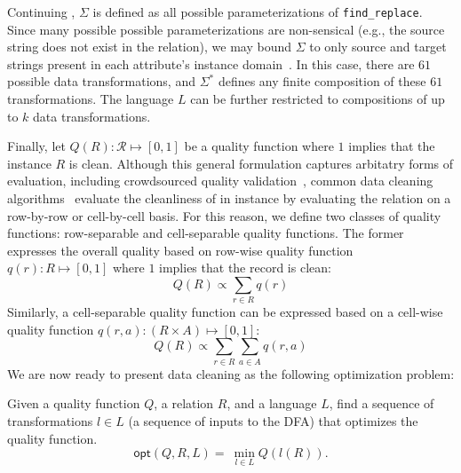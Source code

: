 \begin{example}\label{ex2}
  Continuing , $\Sigma$ is defined as all possible parameterizations of \texttt{find\_replace}.  Since many possible possible parameterizations are non-sensical (e.g., the source string does not exist in the relation), we may bound $\Sigma$ to only source and target strings present in each attribute's instance domain~\cite{workthatdoesthis}.  In this case, there are $61$ possible data transformations, and $\Sigma^*$ defines any finite composition of these $61$ transformations.  The language $L$ can be further restricted to compositions of up to $k$ data transformations.  
\end{example}

Finally, let $Q(R): \mathcal{R} \mapsto [0,1]$ be a quality function where $1$ implies that the instance $R$ is clean.
Although this general formulation captures arbitatry forms of evaluation, including crowdsourced quality validation~\cite{tamr,stuff}, common data cleaning algorithms~\cite{} evaluate the cleanliness of in instance by evaluating the relation on a row-by-row or cell-by-cell basis.  For this reason, we define two classes of quality functions: row-separable and cell-separable quality functions.
The former expresses the overall quality based on row-wise quality function $q(r): R \mapsto [0,1]$ where $1$ implies that the record is clean:
\[Q(R) \propto \sum_{r \in R} q(r)\]
\noindent Similarly, a cell-separable quality function can be expressed based on a cell-wise quality function $q(r, a): (R\times A) \mapsto [0,1]$:
\[Q(R) \propto \sum_{r \in R} \sum_{a \in A} q(r,a)\]
\noindent We are now ready to present data cleaning as the following optimization problem:
\begin{problem}
Given a quality function $Q$, a relation $R$, and a language $L$, find a sequence of transformations $l \in L$ (a sequence of inputs to the DFA) that optimizes the quality function.
\[
\textsf{opt}(Q,R,L) = ~ \min_{l \in L} Q( l(R) ).  
\]
\end{problem}

